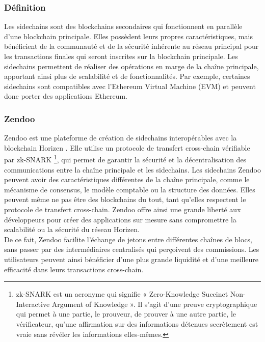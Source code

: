 \subsubsection{Définition}

Les sidechains sont des blockchains secondaires qui fonctionnent en parallèle d'une blockchain principale. Elles possèdent leurs propres caractéristiques, mais bénéficient de la communauté et de la sécurité inhérente au réseau principal pour les transactions finales qui seront inscrites sur la blockchain principale. Les sidechains permettent de réaliser des opérations en marge de la chaîne principale, apportant ainsi plus de scalabilité et de fonctionnalités. Par exemple, certaines sidechains sont compatibles avec l'Ethereum Virtual Machine (EVM) et peuvent donc porter des applications Ethereum.

\subsubsection{Zendoo}

Zendoo est une plateforme de création de sidechains interopérables avec la blockchain Horizen \cite{garoffolo2020zendoo}. Elle utilise un protocole de transfert cross-chain vérifiable par zk-SNARK \footnote{zk-SNARK est un acronyme qui signifie « Zero-Knowledge Succinct Non-Interactive Argument of Knowledge ». Il s'agit d'une preuve cryptographique qui permet à une partie, le prouveur, de prouver à une autre partie, le vérificateur, qu'une affirmation sur des informations détenues secrètement est vraie sans révéler les informations elles-mêmes.}, qui permet de garantir la sécurité et la décentralisation des communications entre la chaîne principale et les sidechains. Les sidechains Zendoo peuvent avoir des caractéristiques différentes de la chaîne principale, comme le mécanisme de consensus, le modèle comptable ou la structure des données. Elles peuvent même ne pas être des blockchains du tout, tant qu'elles respectent le protocole de transfert cross-chain. Zendoo offre ainsi une grande liberté aux développeurs pour créer des applications sur mesure sans compromettre la scalabilité ou la sécurité du réseau Horizen.\\
De ce fait, Zendoo facilite l'échange de jetons entre différentes chaînes de blocs, sans passer par des intermédiaires centralisés qui perçoivent des commissions. Les utilisateurs peuvent ainsi bénéficier d'une plus grande liquidité et d'une meilleure efficacité dans leurs transactions cross-chain.

